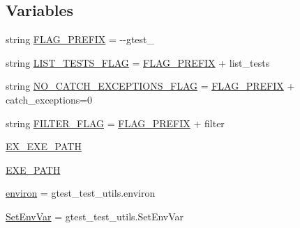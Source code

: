 \subsection*{Variables}
\begin{DoxyCompactItemize}
\item 
string \mbox{\hyperlink{namespacegoogletest_1_1test_1_1googletest-catch-exceptions-test_a0eac6ce19a7544730f48e9ed635da182}{F\+L\+A\+G\+\_\+\+P\+R\+E\+F\+IX}} = \textquotesingle{}-\/-\/gtest\+\_\+\textquotesingle{}
\item 
string \mbox{\hyperlink{namespacegoogletest_1_1test_1_1googletest-catch-exceptions-test_a8847d0162a6c3e6a01a74331f3084da8}{L\+I\+S\+T\+\_\+\+T\+E\+S\+T\+S\+\_\+\+F\+L\+AG}} = \mbox{\hyperlink{namespacegoogletest_1_1test_1_1googletest-catch-exceptions-test_a0eac6ce19a7544730f48e9ed635da182}{F\+L\+A\+G\+\_\+\+P\+R\+E\+F\+IX}} + \textquotesingle{}list\+\_\+tests\textquotesingle{}
\item 
string \mbox{\hyperlink{namespacegoogletest_1_1test_1_1googletest-catch-exceptions-test_aaad2a7abcb760b818aa6802120acd651}{N\+O\+\_\+\+C\+A\+T\+C\+H\+\_\+\+E\+X\+C\+E\+P\+T\+I\+O\+N\+S\+\_\+\+F\+L\+AG}} = \mbox{\hyperlink{namespacegoogletest_1_1test_1_1googletest-catch-exceptions-test_a0eac6ce19a7544730f48e9ed635da182}{F\+L\+A\+G\+\_\+\+P\+R\+E\+F\+IX}} + \textquotesingle{}catch\+\_\+exceptions=0\textquotesingle{}
\item 
string \mbox{\hyperlink{namespacegoogletest_1_1test_1_1googletest-catch-exceptions-test_a1233a65dcef8ecb6f518d43e241aeb8d}{F\+I\+L\+T\+E\+R\+\_\+\+F\+L\+AG}} = \mbox{\hyperlink{namespacegoogletest_1_1test_1_1googletest-catch-exceptions-test_a0eac6ce19a7544730f48e9ed635da182}{F\+L\+A\+G\+\_\+\+P\+R\+E\+F\+IX}} + \textquotesingle{}filter\textquotesingle{}
\item 
\mbox{\hyperlink{namespacegoogletest_1_1test_1_1googletest-catch-exceptions-test_a99d8f5239cc54cda82f69509d3b22160}{E\+X\+\_\+\+E\+X\+E\+\_\+\+P\+A\+TH}}
\item 
\mbox{\hyperlink{namespacegoogletest_1_1test_1_1googletest-catch-exceptions-test_a410cb8694539d864ade93a277bb03fa5}{E\+X\+E\+\_\+\+P\+A\+TH}}
\item 
\mbox{\hyperlink{namespacegoogletest_1_1test_1_1googletest-catch-exceptions-test_a31db01bdbed9bc5476d4747cacb3b668}{environ}} = gtest\+\_\+test\+\_\+utils.\+environ
\item 
\mbox{\hyperlink{namespacegoogletest_1_1test_1_1googletest-catch-exceptions-test_a95c639009082a8cdf39720c3a2dd859c}{Set\+Env\+Var}} = gtest\+\_\+test\+\_\+utils.\+Set\+Env\+Var

\end{DoxyCompactItemize}
